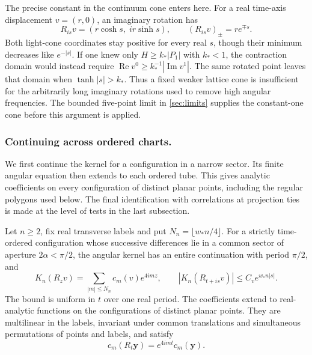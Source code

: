 \documentclass[11pt,letterpaper,reqno]{amsart}
\makeatletter
\theoremstyle{definition}
\newcommand{\ms@minorstart}{%
  \pushQED{\qed}\renewcommand{\qedsymbol}{$\blacksquare$}}
\newenvironment{lemma}[1][]{\ms@minorstart\ms@lemma[#1]}
  {\popQED\endms@lemma}
\theoremstyle{remark}
\makeatother
\begin{document}
The precise constant in the continuum cone enters here. For a real
time-axis displacement $v=(r,0)$, an imaginary rotation has
\[
 R_{is}v=(r\cosh s,\;ir\sinh s),\qquad
 (R_{is}v)_\pm=re^{\mp s}.
\]
Both light-cone coordinates stay positive for every real $s$, though
their minimum decreases like $e^{-|s|}$. If one knew only
$H\ge k_*|P_1|$ with $k_*<1$, the contraction domain would instead
require
$\operatorname{Re}v^0\ge k_*^{-1}|\operatorname{Im}v^1|$.
The same rotated point leaves that domain when
$\tanh|s|>k_*$. Thus a fixed weaker lattice cone is insufficient for
the arbitrarily long imaginary rotations used to remove high angular
frequencies. The bounded five-point limit in \cref{sec:limits}
supplies the constant-one cone before this argument is applied.


\subsubsection*{Continuing across ordered charts.}
\label{hyp:angular-continuation}
We first continue the kernel for a configuration in a narrow sector.
Its finite angular equation then extends to each ordered tube. This
gives analytic coefficients on every configuration of distinct planar
points, including the regular polygons used below. The final
identification with correlations at projection ties is made at the
level of tests in the last subsection.

\begin{lemma}[Finite angular type]\label{lem:finite-angular-type}
Let $n\ge2$, fix real transverse labels and put
$N_n=\lfloor w_*n/4\rfloor$.
For a strictly time-ordered configuration whose successive differences
lie in a common sector of aperture $2\alpha<\pi/2$, the angular
kernel has an entire continuation with period $\pi/2$, and
\begin{equation}\label{eq:finite-harmonics}
 K_n(R_zv)=\sum_{|m|\le N_n}c_m(v)e^{4imz},\qquad
 |K_n(R_{t+is}v)|\le C_v e^{w_*n|s|}.
\end{equation}
The bound is uniform in $t$ over one real period. The coefficients
extend to real-analytic functions on the configurations of distinct
planar points. They are multilinear in the labels, invariant under
common translations and simultaneous permutations of points and
labels, and satisfy
\begin{equation}\label{eq:harmonic-covariance}
 c_m(R_t\mathbf y)=e^{4imt}c_m(\mathbf y).
\end{equation}
\end{lemma}
\end{document}
